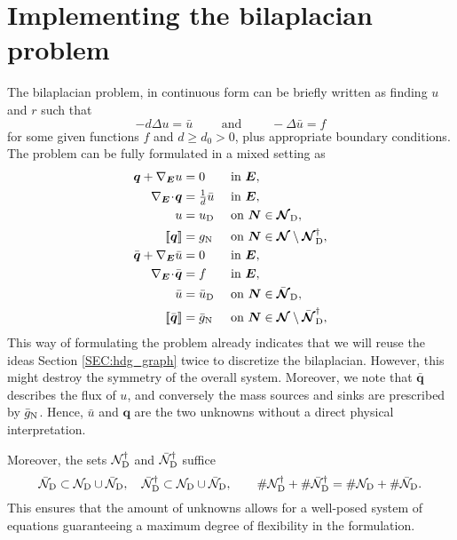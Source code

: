 \documentclass[a4paper, english, 12pt, reqno, draft]{amsart}
\theoremstyle{definition}
\theoremstyle{remark}
\numberwithin{equation}{section}
\newcommand{\setNode}{\ensuremath{\mathcal N}}
\newcommand{\setNodeDir}{\ensuremath{\setNode_\textup D}}
\newcommand{\setNodeBar}{\ensuremath{\bar{\mathcal N}}}
\newcommand{\setNodeDirBar}{\ensuremath{\setNodeBar_\textup D}}
\newcommand{\SetNode}{\ensuremath{\boldsymbol{\mathcal N}}}
\newcommand{\SetNodeDir}{\ensuremath{\SetNode_\textup D}}
\newcommand{\SetNodeBar}{\ensuremath{\bar{\boldsymbol{\mathcal N}}}}
\newcommand{\SetNodeDirBar}{\ensuremath{\SetNodeBar_\textup D}}
\newcommand{\Edge}{{\ensuremath{\boldsymbol E}}}
\newcommand{\Node}{{\ensuremath{\boldsymbol N}}}
\newcommand{\Nabla}{\ensuremath{\nabla_\Edge}}
\newcommand{\Div}{\ensuremath{\Nabla\!\cdot\!}}
\newcommand{\jump}[1]{{[\![ #1 ]\!]}}
\renewcommand{\vec}[1]{\ensuremath{\boldsymbol{#1}}}
\begin{document}
\section{Implementing the bilaplacian problem}
% 
The bilaplacian problem, in continuous form can be briefly written as finding $u$ and $r$ such that
% 
\begin{equation*}
 -d \Delta u = \bar u \qquad \text{ and } \qquad -\Delta \bar u = f
\end{equation*}
% 
for some given functions $f$ and $d \ge d_0 > 0$, plus appropriate boundary conditions. The problem can be fully formulated in a mixed setting as
% 
\begin{subequations}\label{EQ:bilap}
\begin{align}
 \vec q + \Nabla u & = 0 && \text{ in } \Edge,\\
 \Div \vec q & = \tfrac{1}{d} \bar u && \text{ in } \Edge,\\
 u & = u_\textup D && \text{ on } \Node \in \SetNodeDir,\\
 \jump{\vec q} & = g_\textup N && \text{ on } \Node \in \SetNode \setminus \SetNodeDir^\dagger,\\
 \bar{\vec q} + \Nabla \bar u & = 0 && \text{ in } \Edge,\\
 \Div \bar{\vec q} & = f && \text{ in } \Edge,\label{EQ:bilap_f}\\
 \bar u & = \bar u_\textup D && \text{ on } \Node \in \SetNodeDirBar,\\
 \jump{\bar{\vec q}} & = \bar g_\textup N && \text{ on } \Node \in \SetNode \setminus \SetNodeDirBar^\dagger,
\end{align}
\end{subequations}
% 
This way of formulating the problem already indicates that we will reuse the ideas Section \ref{SEC:hdg_graph} twice to discretize the bilaplacian. However, this might destroy the symmetry of the overall system. Moreover, we note that $\bar{\vec q}$ describes the flux of $u$, and conversely the mass sources and sinks are prescribed by $\bar g_\textup N$. Hence, $\bar u$ and $\vec q$ are the two unknowns without a direct physical interpretation. 

Moreover, the sets $\setNodeDir^\dagger$ and $\setNodeDirBar^\dagger$ suffice
% 
\begin{equation}
 \setNodeDirBar \subset \setNodeDir \cup \setNodeDirBar, \quad \setNodeDirBar^\dagger \subset \setNodeDir \cup \setNodeDirBar, \qquad \# \setNodeDir^\dagger + \# \setNodeDirBar^\dagger = \# \setNodeDir + \# \setNodeDirBar.
\end{equation}
% 
This ensures that the amount of unknowns allows for a well-posed system of equations guaranteeing a maximum degree of flexibility in the formulation.
% 
\end{document}
